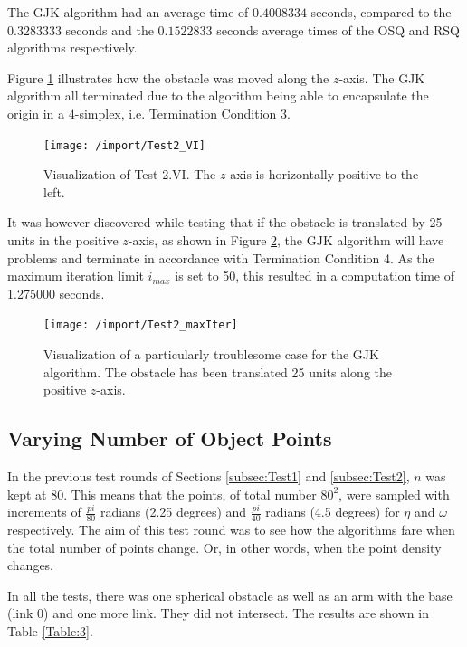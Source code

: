 The \gls{GJK} algorithm had an average time of $0.4008334$ seconds, compared to the $0.3283333$ seconds and the $0.1522833$ seconds average times of the O\gls{SQ} and R\gls{SQ} algorithms respectively. 

Figure \ref{fig:Test2VI} illustrates how the obstacle was moved along the $z$-axis. The \gls{GJK} algorithm all terminated due to the algorithm being able to encapsulate the origin in a $4$-simplex, i.e. Termination Condition 3.
\begin{figure}[h]
	\centering
	\texttt{[image: /import/Test2\_VI]}
	\caption{Visualization of Test 2.VI. The $z$-axis is horizontally positive to the left.}
	\label{fig:Test2VI}
\end{figure}
It was however discovered while testing that if the obstacle is translated by 25 units in the positive $z$-axis, as shown in Figure \ref{fig:Test2max}, the \gls{GJK} algorithm will have problems and terminate in accordance with Termination Condition 4. As the maximum iteration limit $i_{max}$ is set to 50, this resulted in a computation time of 1.275000 seconds.
\begin{figure}[h]
	\centering
	\texttt{[image: /import/Test2\_maxIter]}
	\caption{Visualization of a particularly troublesome case for the GJK algorithm. The obstacle has been translated 25 units along the positive $z$-axis.}
	\label{fig:Test2max}
\end{figure}

\subsection{Varying Number of Object Points}\label{subsec:Test3}

In the previous test rounds of Sections \ref{subsec:Test1} and \ref{subsec:Test2}, $n$ was kept at $80$. This means that the points, of total number $80^2$, were sampled with increments of $\frac{pi}{80}$ radians (2.25 degrees) and $\frac{pi}{40}$ radians (4.5 degrees) for $\eta$ and $\omega$ respectively. The aim of this test round was to see how the algorithms fare when the total number of points change. Or, in other words, when the point density changes. 

In all the tests, there was one spherical obstacle as well as an arm with the base (link 0) and one more link. They did not intersect. The results are shown in Table \ref{Table:3}.

